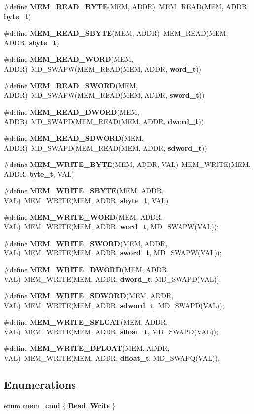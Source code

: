\begin{CompactItemize}
\item 
\#define {\bf MEM\_\-READ\_\-BYTE}(MEM, ADDR)~MEM\_\-READ(MEM, ADDR, {\bf byte\_\-t})
\item 
\#define {\bf MEM\_\-READ\_\-SBYTE}(MEM, ADDR)~MEM\_\-READ(MEM, ADDR, {\bf sbyte\_\-t})
\item 
\#define {\bf MEM\_\-READ\_\-WORD}(MEM, ADDR)~MD\_\-SWAPW(MEM\_\-READ(MEM, ADDR, {\bf word\_\-t}))
\item 
\#define {\bf MEM\_\-READ\_\-SWORD}(MEM, ADDR)~MD\_\-SWAPW(MEM\_\-READ(MEM, ADDR, {\bf sword\_\-t}))
\item 
\#define {\bf MEM\_\-READ\_\-DWORD}(MEM, ADDR)~MD\_\-SWAPD(MEM\_\-READ(MEM, ADDR, {\bf dword\_\-t}))
\item 
\#define {\bf MEM\_\-READ\_\-SDWORD}(MEM, ADDR)~MD\_\-SWAPD(MEM\_\-READ(MEM, ADDR, {\bf sdword\_\-t}))
\item 
\#define {\bf MEM\_\-WRITE\_\-BYTE}(MEM, ADDR, VAL)~MEM\_\-WRITE(MEM, ADDR, {\bf byte\_\-t}, VAL)
\item 
\#define {\bf MEM\_\-WRITE\_\-SBYTE}(MEM, ADDR, VAL)~MEM\_\-WRITE(MEM, ADDR, {\bf sbyte\_\-t}, VAL)
\item 
\#define {\bf MEM\_\-WRITE\_\-WORD}(MEM, ADDR, VAL)~MEM\_\-WRITE(MEM, ADDR, {\bf word\_\-t}, MD\_\-SWAPW(VAL));
\item 
\#define {\bf MEM\_\-WRITE\_\-SWORD}(MEM, ADDR, VAL)~MEM\_\-WRITE(MEM, ADDR, {\bf sword\_\-t}, MD\_\-SWAPW(VAL));
\item 
\#define {\bf MEM\_\-WRITE\_\-DWORD}(MEM, ADDR, VAL)~MEM\_\-WRITE(MEM, ADDR, {\bf dword\_\-t}, MD\_\-SWAPD(VAL));
\item 
\#define {\bf MEM\_\-WRITE\_\-SDWORD}(MEM, ADDR, VAL)~MEM\_\-WRITE(MEM, ADDR, {\bf sdword\_\-t}, MD\_\-SWAPD(VAL));
\item 
\#define {\bf MEM\_\-WRITE\_\-SFLOAT}(MEM, ADDR, VAL)~MEM\_\-WRITE(MEM, ADDR, {\bf sfloat\_\-t}, MD\_\-SWAPD(VAL));
\item 
\#define {\bf MEM\_\-WRITE\_\-DFLOAT}(MEM, ADDR, VAL)~MEM\_\-WRITE(MEM, ADDR, {\bf dfloat\_\-t}, MD\_\-SWAPQ(VAL));
\end{CompactItemize}
\subsection*{Enumerations}
\begin{CompactItemize}
\item 
enum {\bf mem\_\-cmd} \{ {\bf Read}, 
{\bf Write}
 \}
\end{CompactItemize}
